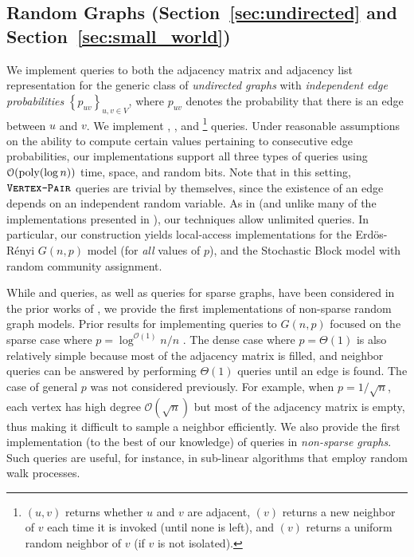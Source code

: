 \subsection{Random Graphs (Section~\ref{sec:undirected} and Section~\ref{sec:small_world})}%
\label{sec:random_graphs}
We implement queries to both the adjacency matrix and adjacency list representation
for the generic class of \emph{undirected graphs} with {\em independent edge probabilities} $\left\{ p_{uv} \right\}_{u,v\in V}$,
where $p_{uv}$ denotes the probability that there is an edge between $u$ and $v$.
We implement , , and 
\footnote{$(u,v)$ returns whether $u$ and $v$ are adjacent, $(v)$ returns a new neighbor of $v$ each time
it is invoked (until none is left), and $(v)$ returns a uniform random neighbor of $v$ (if $v$ is not isolated).} queries.
Under reasonable assumptions on the ability to compute certain values pertaining to consecutive edge probabilities,
our implementations support all three types of queries using $\mathcal{O}(\mathrm{poly}(\log n))$ time, space, and random bits.
Note that in this setting, $\texttt{\textsc{Vertex-Pair}}$ queries are trivial by themselves,
since the existence of an edge depends on an independent random variable.
As in \cite{reut} (and unlike many of the implementations presented in \cite{huge_old,huge}), our techniques allow unlimited queries.
In particular, our construction yields local-access implementations for the Erd\"{o}s-R\'{e}nyi $G(n,p)$ model (for \emph{all} values of $p$),
and the Stochastic Block model with random community assignment.


While  and  queries, as well as  queries for sparse graphs,
have been considered in the prior works of \cite{reut, huge_old, huge, sparse},
we provide the first implementations of non-sparse random graph models.
Prior results for implementing queries to $G(n,p)$ focused on the sparse case where $p = \log^{\mathcal O(1)} n/n$ \cite{sparse}.
The dense case where $p = \Theta(1)$ is also relatively simple because most of the adjacency matrix is filled,
and neighbor queries can be answered by performing $\Theta(1)$  queries until an edge is found.
The case of general $p$ was not considered previously.
For example, when $p = 1/\sqrt{n}$, each vertex has high degree $\mathcal O(\sqrt{n})$ but most of the adjacency matrix is empty,
thus making it difficult to sample a neighbor efficiently.
We also provide the first implementation (to the best of our knowledge) of  queries in \emph{non-sparse graphs}.
Such queries are useful, for instance, in sub-linear algorithms that employ random walk processes.



